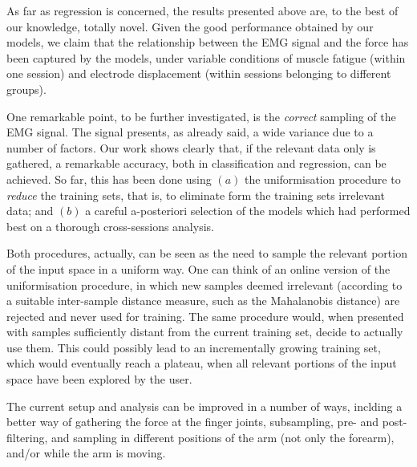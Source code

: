As far as regression is concerned, the results presented above
are, to the best of our knowledge, totally novel. Given the good
performance obtained by our models, we claim that the relationship
between the EMG signal and the force has been captured by the
models, under variable conditions of muscle fatigue (within one
session) and electrode displacement (within sessions belonging to
different groups).

One remarkable point, to be further investigated, is the
\emph{correct} sampling of the EMG signal. The signal presents, as
already said, a wide variance due to a number of factors. Our work
shows clearly that, if the relevant data only is gathered, a
remarkable accuracy, both in classification and regression, can be
achieved. So far, this has been done using $(a)$ the
uniformisation procedure to \emph{reduce} the training sets, that
is, to eliminate form the training sets irrelevant data; and $(b)$
a careful a-posteriori selection of the models which had performed
best on a thorough cross-sessions analysis.

Both procedures, actually, can be seen as the need to sample the
relevant portion of the input space in a uniform way. One can think of
an online version of the uniformisation procedure, in which new
samples deemed irrelevant (according to a suitable inter-sample
distance measure, such as the Mahalanobis distance) are rejected and
never used for training. The same procedure would, when presented with
samples sufficiently distant from the current training set, decide to
actually use them. This could possibly lead to an incrementally
growing training set, which would eventually reach a plateau, when all
relevant portions of the input space have been explored by the user.

The current setup and analysis can be improved in a number of
ways, inclding a better way of gathering the force at the finger
joints, subsampling, pre- and post-filtering, and sampling in
different positions of the arm (not only the forearm), and/or
while the arm is moving.
